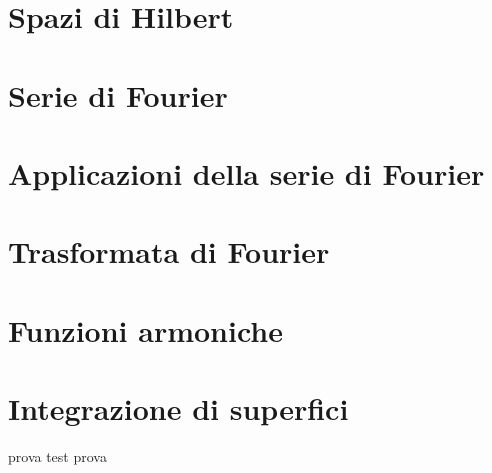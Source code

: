 \documentclass[a4paper, 11pt]{report}
\begin{document}
\chapter{Spazi di Hilbert}


\chapter{Serie di Fourier}


\chapter{Applicazioni della serie di Fourier}


\chapter{Trasformata di Fourier}


\chapter{Funzioni armoniche}


\chapter{Integrazione di superfici}


\newpage

prova test prova 
\end{document}
